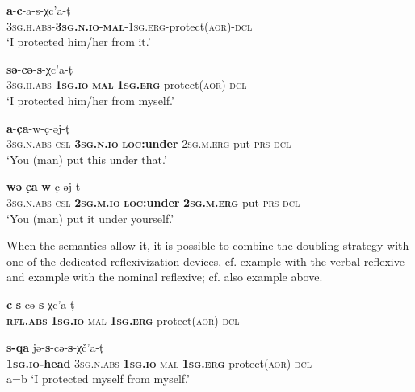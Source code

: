 \documentclass[output=paper]{langscibook}
\begin{document}
\ea 
\label{ex:Arkadiev:47}
    \ea 
    \label{ex:Arkadiev:47a}
    \textbf{{a}}{{}-}\textbf{{c}}{{}-a-s-χc’a-t{̣}}\\
      \textsc{3sg.h.abs-}\textbf{\textsc{3sg.n.io}}\textsc{{}-}\textbf{\textsc{mal}}\textsc{-1sg.erg}-protect(\textsc{aor)-dcl}\\
    \glt ‘I protected him/her from it.’
    
    \ex 
    \label{ex:Arkadiev:47b}
    \textbf{{s{ə}}}{{}-}\textbf{{c{ə}}}{{}-}\textbf{{s}}{{}-χc’a-t{̣}}\\
    \textsc{3sg.h.abs-}\textbf{\textsc{1sg.io}}\textsc{{}-}\textbf{\textsc{mal}}\textsc{{}-}\textbf{\textsc{1sg.erg}}{}-protect(\textsc{aor)-dcl}\\
    \glt  ‘I protected him/her from myself.’
\z  
\z
 
 \ea 
\label{ex:Arkadiev:48}
    \ea 
    \label{ex:Arkadiev:48a}
    \textbf{{a}}{{}-}\textbf{{c{̣}a}}{{}-w-c{̣}-{ə}j-t{̣}}\\
       \textsc{3sg.n.abs-csl-}\textbf{\textsc{3sg.n.io}}\textsc{{}-}\textbf{\textsc{loc}}\textbf{:under}{}-\textsc{2sg.m.erg}{}-put-\textsc{prs-dcl}\\
    \glt  ‘You (man) put this under that.’
    
    \ex 
    \label{ex:Arkadiev:48b}
    \textbf{{w{ə}}}{{}-}\textbf{{c{̣}a}}{{}-}\textbf{{w}}{{}-c{̣}-{ə}j-t{̣}}\\
    \textsc{3sg.n.abs-csl-}\textbf{\textsc{2sg.m.io}}\textsc{{}-}\textbf{\textsc{loc}}\textbf{:under}{}-\textbf{\textsc{2sg.m.erg}}{}-put-\textsc{prs-dcl}\\
    \glt   ‘You (man) put it under yourself.’
\z  
\z


When the semantics allow it, it is possible to combine the doubling strategy with one of the dedicated reflexivization devices, cf. example  with the verbal reflexive and example  with the nominal reflexive; cf. also example  above.

 \ea 
\label{ex:Arkadiev:49}
    \ea 
    \label{ex:Arkadiev:49a}
    \gll \textbf{{c}}{{}-}\textbf{{s}}{{}-c{ə}-}\textbf{{s}}{{}-χc’a-t{̣}}\\
       \textbf{\textsc{rfl.abs}}\textsc{{}-}\textbf{\textsc{1sg.io}}\textsc{{}-mal-}\textbf{\textsc{1sg.erg}}\textsc{{}-}protect(\textsc{aor)-dcl}\\
    \glt 
    
    \ex 
    \label{ex:Arkadiev:49b}
    \gll \textbf{{s-qa}}  {j{ə}-}\textbf{{s}}{{}-c{ə}-}\textbf{{s}}{{}-χč’a-t{̣}}\\
    \textbf{\textsc{1sg.io}}\textbf{{}-head}  \textsc{3sg.n.abs-}\textbf{\textsc{1sg.io}}\textsc{{}-mal-}\textbf{\textsc{1sg.erg}}{}-protect(\textsc{aor)-dcl}\\
    \glt   a=b ‘I protected myself from myself.’
\z  
\z
\end{document}
